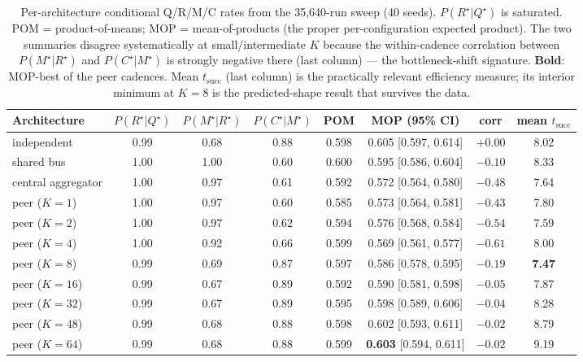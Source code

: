 \documentclass{article}
\begin{document}
\begin{table}[h]
\caption{Per-architecture conditional Q/R/M/C rates from the 35{,}640-run sweep (40 seeds). $P(R^\star|Q^\star)$ is saturated. POM = product-of-means; MOP = mean-of-products (the proper per-configuration expected product). The two summaries disagree systematically at small/intermediate $K$ because the within-cadence correlation between $P(M^\star|R^\star)$ and $P(C^\star|M^\star)$ is strongly negative there (last column) --- the bottleneck-shift signature. \textbf{Bold}: MOP-best of the peer cadences. Mean $t_{\mathrm{succ}}$ (last column) is the practically relevant efficiency measure; its interior minimum at $K=8$ is the predicted-shape result that survives the data.}
\label{tab:multi-agent-cond}
\centering
\scriptsize
\setlength{\tabcolsep}{3.5pt}
\begin{tabular}{l c c c c c c c}
\toprule
Architecture & $P(R^\star|Q^\star)$ & $P(M^\star|R^\star)$ & $P(C^\star|M^\star)$ & POM & MOP (95\% CI) & corr & mean $t_{\mathrm{succ}}$ \\
\midrule
independent          & 0.99 & 0.68 & 0.88 & 0.598 & 0.605 [0.597, 0.614] & $+0.00$ & 8.02 \\
shared bus           & 1.00 & 1.00 & 0.60 & 0.600 & 0.595 [0.586, 0.604] & $-0.10$ & 8.33 \\
central aggregator   & 1.00 & 0.97 & 0.61 & 0.592 & 0.572 [0.564, 0.580] & $-0.48$ & 7.64 \\
peer ($K=1$)         & 1.00 & 0.97 & 0.60 & 0.585 & 0.573 [0.564, 0.581] & $-0.43$ & 7.80 \\
peer ($K=2$)         & 1.00 & 0.97 & 0.62 & 0.594 & 0.576 [0.568, 0.584] & $-0.54$ & 7.59 \\
peer ($K=4$)         & 1.00 & 0.92 & 0.66 & 0.599 & 0.569 [0.561, 0.577] & $-0.61$ & 8.00 \\
peer ($K=8$)         & 0.99 & 0.69 & 0.87 & 0.597 & 0.586 [0.578, 0.595] & $-0.19$ & \textbf{7.47} \\
peer ($K=16$)        & 0.99 & 0.67 & 0.89 & 0.592 & 0.590 [0.581, 0.598] & $-0.05$ & 7.87 \\
peer ($K=32$)        & 0.99 & 0.67 & 0.89 & 0.595 & 0.598 [0.589, 0.606] & $-0.04$ & 8.28 \\
peer ($K=48$)        & 0.99 & 0.68 & 0.88 & 0.598 & 0.602 [0.593, 0.611] & $-0.02$ & 8.79 \\
peer ($K=64$)        & 0.99 & 0.68 & 0.88 & 0.599 & \textbf{0.603} [0.594, 0.611] & $-0.02$ & 9.19 \\
\bottomrule
\end{tabular}
\end{table}
\end{document}
